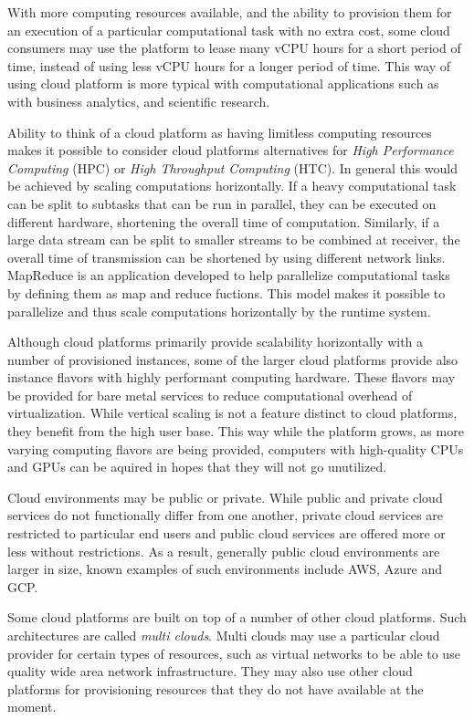 \documentclass[officiallayout]{tktla}
\begin{document}
With more computing resources available, and the ability to provision them for
an execution of a particular computational task with no extra cost, some cloud
consumers may use the platform to lease many vCPU hours for a short period of
time, instead of using less vCPU hours for a longer period of time. This way of
using cloud platform is more typical with computational applications such as
with business analytics, and scientific research.

Ability to think of a cloud platform as having limitless computing resources
makes it possible to consider cloud platforms alternatives for \textit{High
Performance Computing} (HPC) or \textit{High Throughput Computing} (HTC). In
general this would be achieved by scaling computations horizontally. If a heavy
computational task can be split to subtasks that can be run in parallel, they
can be executed on different hardware, shortening the overall time of
computation. Similarly, if a large data stream can be split to smaller streams
to be combined at receiver, the overall time of transmission can be shortened
by using different network links. MapReduce \cite{mapreduce} is an application
developed to help parallelize computational tasks by defining them as map and
reduce fuctions. This model makes it possible to parallelize and thus scale
computations horizontally by the runtime system.

Although cloud platforms primarily provide scalability horizontally with a
number of provisioned instances, some of the larger cloud platforms provide
also instance flavors with highly performant computing hardware. These flavors
may be provided for bare metal services to reduce computational overhead of
virtualization. While vertical scaling is not a feature distinct to cloud
platforms, they benefit from the high user base. This way while the platform
grows, as more varying computing flavors are being provided, computers with
high-quality CPUs and GPUs can be aquired in hopes that they will not go
unutilized.

Cloud environments may be public or private. While public and private cloud
services do not functionally differ from one another, private cloud services
are restricted to particular end users and public cloud services are offered
more or less without restrictions. As a result, generally public cloud
environments are larger in size, known examples of such environments include
AWS, Azure and GCP.

Some cloud platforms are built on top of a number of other cloud platforms.
Such architectures are called \textit{multi clouds}. Multi clouds may use a
particular cloud provider for certain types of resources, such as virtual
networks to be able to use quality wide area network infrastructure. They may
also use other cloud platforms for provisioning resources that they do not have
available at the moment.
\end{document}
